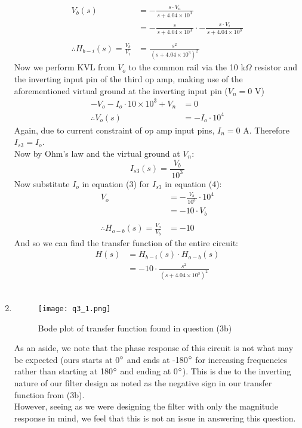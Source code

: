\begin{enumerate}
{\begin{align*}
			V_b(s) &= -\frac{s \cdot V_a}{\, s + 4.04 \times 10^3 \,} \\
			&= -\frac{s}{\, s + 4.04 \times 10^3 \,} \cdot -\frac{s \cdot V_i}{\, s + 4.04 \times 10^3 \,} \\
			\\
			\therefore H_{b-i}(s) = \frac{V_b}{V_i} &= \frac{s^2}{\, \left(s + 4.04 \times 10^3 \right)^2 \,}
		\end{align*}
		Now we perform KVL from $V_o$ to the common rail via the 10 k$\Omega$ resistor and the inverting input pin of the third op amp, making use of the aforementioned virtual ground at the inverting input pin ($V_n = 0$ V)
		\begin{align}
			-V_o - I_o \cdot 10 \times 10^3 + V_n &= 0 \nonumber \\
			\therefore V_o(s) &= - I_o \cdot 10^4
		\end{align}
		Again, due to current constraint of op amp input pins, $I_n = 0$ A. Therefore $I_{s3} = I_o$. \\
		Now by Ohm's law and the virtual ground at $V_n$:
		\begin{equation}
			I_{s3}(s) = \frac{V_b}{\, 10^3 \,}
		\end{equation}
		Now substitute $I_o$ in equation (3) for $I_{s3}$ in equation (4):
		\begin{align*}
			V_o &= -\frac{V_b}{\, 10^3 \,} \cdot 10^4 \\
			&= -10 \cdot V_b \\
			\\
			\therefore H_{o-b}(s) = \frac{V_o}{V_b} &= -10
		\end{align*}
		And so we can find the transfer function of the entire circuit:
		\begin{align*}
			H(s) &= H_{b-i}(s) \cdot H_{o-b}(s) \\
			&= -10 \cdot \frac{s^2}{\, \left(s + 4.04 \times 10^3 \right)^2 \,}
		\end{align*}
		\\
	}
	
	\item{ 
		\quad 	%
		\begin{figure}[H]
			\centering
			\texttt{[image: q3\_1.png]}
			\caption{Bode plot of transfer function found in question (3b)}
		\end{figure}
		As an aside, we note that the phase response of this circuit is not what may be expected (ours starts at 0$\degree$ and ends at -180$\degree$ for increasing frequencies rather than starting at 180$\degree$ and ending at 0$\degree$). This is due to the inverting nature of our filter design as noted as the negative sign in our transfer function from (3b). \\
		However, seeing as we were designing the filter with only the magnitude response in mind, we feel that this is not an issue in answering this question.
		\\
	}
	
\end{enumerate}